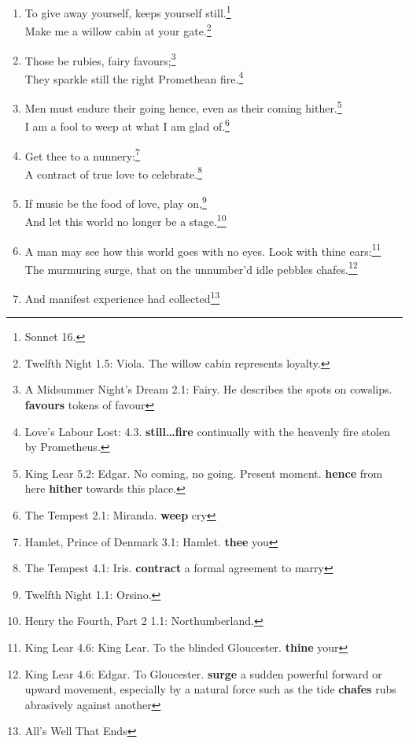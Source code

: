 \documentclass[17pt,twoside]{extarticle}
\begin{document}
\begin{enumerate}
{    her past. \textbf{seest thou else} else do you see \textbf{abysm}
    bottomless pit}\\So full of shapes is fancy that it alone is high
  fantastical.\footnote{Twelfth Night 1.1: Duke Orsino. \textbf{fancy}
    imagination \textbf{fantastical} remote from reality}
\item
  To give away yourself, keeps yourself still.\footnote{Sonnet 16.}\\Make
  me a willow cabin at your gate.\footnote{Twelfth Night 1.5: Viola. The
    willow cabin represents loyalty.}
\item
  Those be rubies, fairy favours;\footnote{A Midsummer Night's Dream
    2.1: Fairy. He describes the spots on cowslips. \textbf{favours}
    tokens of favour}\\They sparkle still the right Promethean
  fire.\footnote{Love's Labour Lost: 4.3. \textbf{still\ldots{}fire}
    continually with the heavenly fire stolen by Prometheus.}
\item
  Men must endure their going hence, even as their coming
  hither.\footnote{King Lear 5.2: Edgar. No coming, no going. Present
    moment. \textbf{hence} from here \textbf{hither} towards this place.}\\I
  am a fool to weep at what I am glad of.\footnote{The Tempest 2.1:
    Miranda. \textbf{weep} cry}
\item
  Get thee to a nunnery:\footnote{Hamlet, Prince of Denmark 3.1: Hamlet.
    \textbf{thee} you}\\A contract of true love to celebrate.\footnote{The
    Tempest 4.1: Iris. \textbf{contract} a formal agreement to marry}
\item
  If music be the food of love, play on,\footnote{Twelfth Night 1.1:
    Orsino.}\\And let this world no longer be a stage.\footnote{Henry
    the Fourth, Part 2 1.1: Northumberland.}
\item
  A man may see how this world goes with no eyes. Look with thine
  ears:\footnote{King Lear 4.6: King Lear. To the blinded Gloucester.
    \textbf{thine} your}\\The murmuring surge, that on the unnumber'd
  idle pebbles chafes.\footnote{King Lear 4.6: Edgar. To Gloucester.
    \textbf{surge} a sudden powerful forward or upward movement,
    especially by a natural force such as the tide \textbf{chafes} rubs
    abrasively against another}
\item
  And manifest experience had collected\footnote{All's Well That Ends
}
\end{enumerate}
\end{document}
